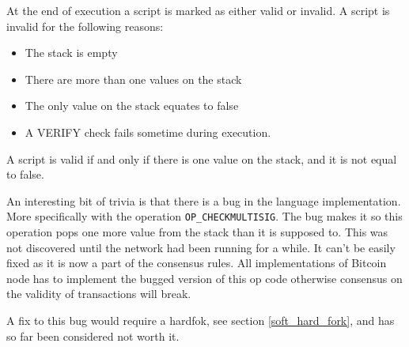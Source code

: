 \label{script_valid}
At the end of execution a script is marked as either valid or invalid. A script is invalid for the following reasons:

\begin{itemize}
	\item The stack is empty
	\item There are more than one values on the stack
	\item The only value on the stack equates to false
	\item A VERIFY check fails sometime during execution.
\end{itemize}

A script is valid if and only if there is one value on the stack, and it is not equal to false.

An interesting bit of trivia is that there is a bug in the language implementation. More specifically with the operation \texttt{OP\_CHECKMULTISIG}. The bug makes it so this operation pops one more value from the stack than it is supposed to. This was not discovered until the network had been running for a while. It can't be easily fixed as it is now a part of the consensus rules. All implementations of Bitcoin node has to implement the bugged version of this op code otherwise consensus on the validity of transactions will break.

A fix to this bug would require a hardfok, see section \ref{soft_hard_fork}, and has so far been considered not worth it.